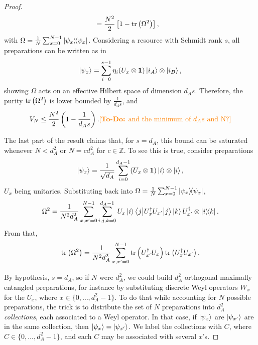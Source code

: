 \begin{proof}
\begin{align*}
            &= \frac{N^2}{2} \left[ 1 - \text{tr}\left( \Omega^2 \right) \right] ,
        \end{align*}
        with $\Omega = \frac{1}{N} \sum_{x=0}^{N-1} \ketbra{\psi_x}{\psi_x}$. Considering a resource with Schmidt rank $s$, all preparations can be written as in
        $$
            \ket{\psi_x} = \sum_{i = 0}^{s - 1} \eta_i (U_x \otimes \mathbf{1}) \ket{i_A} \otimes \ket{i_B} ,
        $$
        showing $\Omega$ acts on an effective Hilbert space of dimension $d_A s$. Therefore, the purity $\text{tr}\left( \Omega^2 \right)$ is lower bounded by $\frac{1}{d_A s}$, and
        $$
            V_N \leq \frac{N^2}{2} \left( 1 - \frac{1}{d_A s} \right) . \text{\textcolor{orange}{[\textbf{To-Do:} and the minimum of $d_A s$ and N?]}}
        $$

        The last part of the result claims that, for $s=d_A$, this bound can be saturated whenever $N < d_A^2$ or $N = c d_A^2$ for $c \in \mathbb{Z}$. To see this is true, consider preparations
        $$
            \ket{\psi_x} = \frac{1}{\sqrt{d_A}} \sum_{i=0}^{d_A - 1} (U_x \otimes \mathbf{1}) \ket{i} \otimes \ket{i} ,
        $$
        $U_x$ being unitaries. Substituting back into $\Omega = \frac{1}{N} \sum_{x=0}^{N-1} \ketbra{\psi_x}{\psi_x}$,
        $$
            \Omega^2 = \frac{1}{N^2 d_A^2} \sum_{x, x^\prime = 0}^{N - 1} \sum_{i, j, k = 0}^{d_A - 1} U_x \ket{i} \left\langle j \middle\vert U_x^\dagger U_{x^\prime} \middle\vert j \right\rangle \ket{k} U_{x^\prime}^\dagger \otimes \ketbra{i}{k} .
        $$
        From that,
        $$
            \text{tr}\left( \Omega^2 \right) = \frac{1}{N^2 d_A^2} \sum_{x, x^\prime = 0}^{N-1} \text{tr}\left( U_{x^\prime}^\dagger U_x \right) \text{tr}\left( U_{x}^\dagger U_{x^\prime} \right) .
        $$

        By hypothesis, $s=d_A$, so if $N$ were $d_A^2$, we could build $d_A^2$ orthogonal maximally entangled preparations, for instance by substituting discrete Weyl operators $W_x$ for the $U_x$, where $x \in \{0, \ldots, d_A^2 - 1 \}$. To do that while accounting for $N$ possible preparations, the trick is to distribute the set of $N$ preparations into $d_A^2$ \emph{collections}, each associated to a Weyl operator. In that case, if $\ket{\psi_x}$ are $\ket{\psi_{x^\prime}}$ are in the same collection, then $\ket{\psi_x} = \ket{\psi_{x^\prime}}$. We label the collections with $C$, where $C \in \{0, \ldots, d_A^2 -1 \}$, and each $C$ may be associated with several $x$'s.
        

\end{proof}
